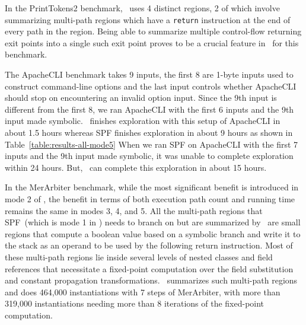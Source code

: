 In the PrintTokens2 benchmark, \tool\ uses 4 distinct regions, 2 of which involve summarizing multi-path regions which
have a {\tt return} instruction at the end of every path in the region.
%
Being able to summarize multiple control-flow returning exit points into a single such exit point proves to be a crucial
feature in \tool\ for this benchmark.

The ApacheCLI benchmark takes 9 inputs, the first 8 are 1-byte inputs used to construct command-line options and
the last input controls whether ApacheCLI should stop on encountering an invalid option input.
%
Since the 9th input is different from the first 8, we ran ApacheCLI with the first 6 inputs and the 9th input
made symbolic.
%
\tool\ finishes exploration with this setup of ApacheCLI in about 1.5 hours whereas SPF finishes exploration in about 9
hours as shown in Table~\ref{table:results-all-mode5}
%
When we ran SPF on ApacheCLI with the first 7 inputs and the 9th input made symbolic, it was unable to complete
exploration within 24 hours.
%
But, \tool\ can complete this exploration in about 15 hours.

In the MerArbiter benchmark, while the most significant benefit is introduced in mode 2 of \tool, the benefit in terms of
both execution path count and running time remains the same in modes 3, 4, and 5.
%
All the multi-path regions that SPF~(which is mode 1 in \tool) needs to branch on but are summarized by \tool\ are small
regions that compute a boolean value based on a symbolic branch and write it to the stack as an operand to be used
by the following return instruction.
%
Most of these multi-path regions lie inside several levels of nested classes and field references that necessitate
a fixed-point computation over the field substitution and constant propagation transformations.
%
\tool\ summarizes such multi-path regions and does 464,000 instantiations with 7 steps of MerArbiter, with more than
319,000 instantiations needing more than 8 iterations of the fixed-point computation.